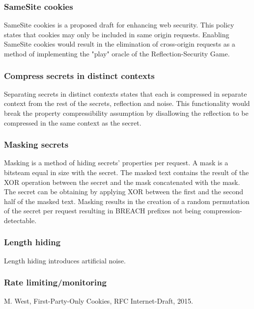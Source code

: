 \documentclass{article}
\begin{document}
\subsubsection{SameSite cookies}
SameSite cookies \cite{c1} is a proposed draft for enhancing web security. This policy
states that cookies may only be included in same origin requests. Enabling
SameSite cookies would result in the elimination of cross-origin requests as a
method of implementing the "play" oracle of the Reflection-Security Game.

\subsubsection{Compress secrets in distinct contexts}
Separating secrets in distinct contexts states that each is compressed
in separate context from the rest of the secrets, reflection and noise. This
functionality would break the property compressibility assumption by disallowing
the reflection to be compressed in the same context as the secret.

\subsubsection{Masking secrets}
Masking is a method of hiding secrets' properties per request. A mask is a
bitsteam equal in size with the secret. The masked text contains the result of
the XOR operation between the secret and the mask concatenated with the mask.
The secret can be obtaining by applying XOR between the first and the second
half of the masked text. Masking results in the creation of a random permutation
of the secret per request resulting in BREACH prefixes not being
compression-detectable.

\subsubsection{Length hiding}
Length hiding introduces artificial noise.

\subsubsection{Rate limiting/monitoring}

\begin{thebibliography}{1}

 M. West, First-Party-Only Cookies, RFC Internet-Draft, 2015.

\end{thebibliography}
\end{document}
